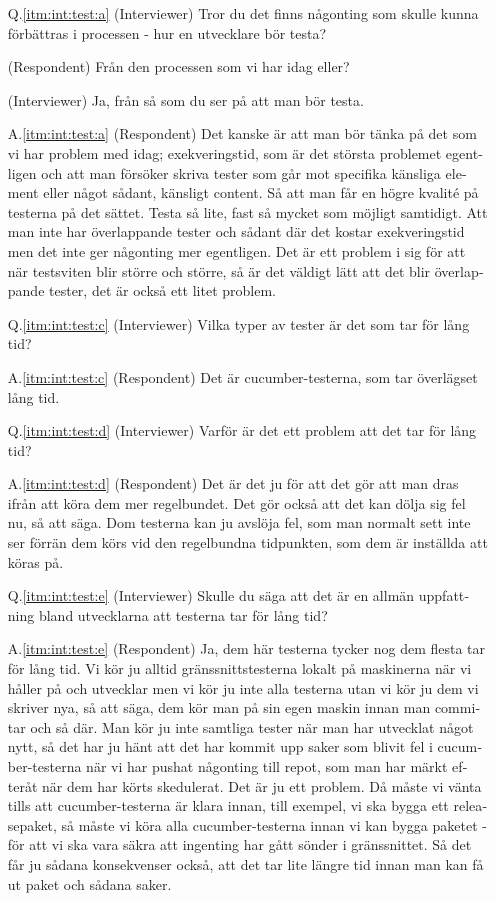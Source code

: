 \begin{otherlanguage}{swedish}
\begin{itemize}
  \item[Q.\ref{itm:int:test:a}] (Interviewer) Tror du det finns någonting som skulle kunna förbättras i processen - hur en utvecklare bör testa?
  \item[] (Respondent) Från den processen som vi har idag eller?
  \item[] (Interviewer) Ja, från så som du ser på att man bör testa.
  \item[A.\ref{itm:int:test:a}] (Respondent) Det kanske är att man bör tänka på det som vi har problem med idag; exekveringstid, som är det största problemet egentligen och att man försöker skriva tester som går mot specifika känsliga element eller något sådant, känsligt content. Så att man får en högre kvalité på testerna på det sättet. Testa så lite, fast så mycket som möjligt samtidigt. Att man inte har överlappande tester och sådant där det kostar exekveringstid men det inte ger någonting mer egentligen. Det är ett problem i sig för att när testsviten blir större och större, så är det väldigt lätt att det blir överlappande tester, det är också ett litet problem.
  
  \item[Q.\ref{itm:int:test:c}] (Interviewer) Vilka typer av tester är det som tar för lång tid?
  \item[A.\ref{itm:int:test:c}] (Respondent) Det är cucumber-testerna, som tar överlägset lång tid.
  
   \item[Q.\ref{itm:int:test:d}] (Interviewer) Varför är det ett problem att det tar för lång tid?
  \item[A.\ref{itm:int:test:d}] (Respondent) Det är det ju för att det gör att man dras ifrån att köra dem mer regelbundet. Det gör också att det kan dölja sig fel nu, så att säga. Dom testerna kan ju avslöja fel, som man normalt sett inte ser förrän dem körs vid den regelbundna tidpunkten, som dem är inställda att köras på. 
  
  \item[Q.\ref{itm:int:test:e}] (Interviewer) Skulle du säga att det är en allmän uppfattning bland utvecklarna att testerna tar för lång tid?
  \item[A.\ref{itm:int:test:e}] (Respondent) Ja, dem här testerna tycker nog dem flesta tar för lång tid. Vi kör ju alltid gränssnittstesterna lokalt på maskinerna när vi håller på och utvecklar men vi kör ju inte alla testerna utan vi kör ju dem vi skriver nya, så att säga, dem kör man på sin egen maskin innan man commitar och så där. Man kör ju inte samtliga tester när man har utvecklat något nytt, så det har ju hänt att det har kommit upp saker som blivit fel i cucumber-testerna när vi har pushat någonting till repot, som man har märkt efteråt när dem har körts skedulerat. Det är ju ett problem. Då måste vi vänta tills att cucumber-testerna är klara innan, till exempel, vi ska bygga ett releasepaket, så måste vi köra alla cucumber-testerna innan vi kan bygga paketet - för att vi ska vara säkra att ingenting har gått sönder i gränssnittet. Så det får ju sådana konsekvenser också, att det tar lite längre tid innan man kan få ut paket och sådana saker.
  

\end{itemize}
\end{otherlanguage}
